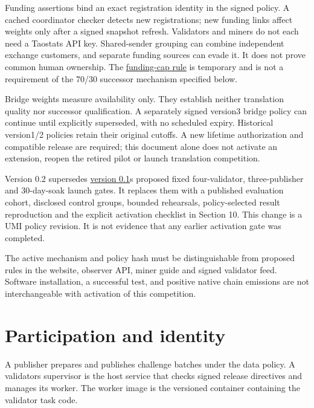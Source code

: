 Funding assertions bind an exact registration identity in the signed policy.
A cached coordinator checker detects new registrations; new funding links
affect weights only after a signed snapshot refresh. Validators and miners
do not each need a Taostats API key. Shared-sender grouping can combine
independent exchange customers, and separate funding sources can evade it.
It does not prove common human ownership. The
\href{https://github.com/Umi-BitSign/umi/blob/main/docs/operators/bridge.md}{funding-cap rule} is temporary and
is not a requirement of the 70/30 successor mechanism specified below.

Bridge weights measure availability only. They establish neither translation
quality nor successor qualification. A separately signed version3 bridge policy
can continue until explicitly superseded, with no scheduled expiry. Historical
version1/2 policies retain their original cutoffs. A new lifetime authorization
and compatible release are required; this document alone does not activate an
extension, reopen the retired pilot or launch translation competition.

Version 0.2 supersedes \href{https://github.com/Umi-BitSign/umi/blob/main/whitepaper/LEGACY_V0_1.md}{version 0.1}\textquotesingle s proposed fixed four-validator,
three-publisher and 30-day-soak launch gates. It replaces them with a published
evaluation cohort, disclosed control groups, bounded rehearsals, policy-selected
result reproduction and the explicit activation checklist in Section 10.
This change is a UMI policy revision. It is not evidence that any earlier
activation gate was completed.

The active mechanism and policy hash must be distinguishable from proposed
rules in the website, observer API, miner guide and signed validator feed.
Software installation, a successful test, and positive native chain emissions
are not interchangeable with activation of this competition.

\section{Participation and identity}\label{2-participation-and-identity}

A publisher prepares and publishes challenge batches under the data policy.
A validator\textquotesingle s supervisor is the host service that checks signed release
directives and manages its worker. The worker image is the versioned container
containing the validator task code.

